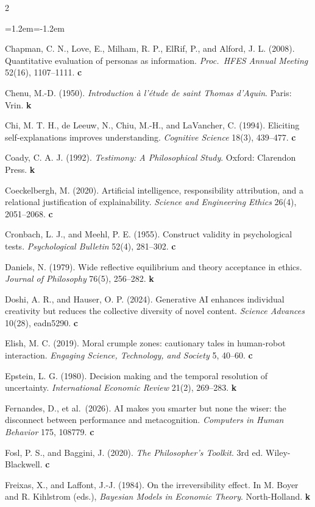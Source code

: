 \documentclass[11pt,a4paper]{article}
\newcounter{art}
\begin{document}
\begin{multicols}{2}
\begin{list}{}{\leftmargin=1.2em\itemindent=-1.2em\itemsep=1pt}
\item Chapman, C. N., Love, E., Milham, R. P., ElRif, P., and Alford, J. L. (2008). Quantitative evaluation of personas as information. \textit{Proc.\ HFES Annual Meeting} 52(16), 1107--1111. \textbf{c}
\item Chenu, M.-D. (1950). \textit{Introduction à l'étude de saint Thomas d'Aquin}. Paris: Vrin. \textbf{k}
\item Chi, M. T. H., de Leeuw, N., Chiu, M.-H., and LaVancher, C. (1994). Eliciting self-explanations improves understanding. \textit{Cognitive Science} 18(3), 439--477. \textbf{c}
\item Coady, C. A. J. (1992). \textit{Testimony: A Philosophical Study}. Oxford: Clarendon Press. \textbf{k}
\item Coeckelbergh, M. (2020). Artificial intelligence, responsibility attribution, and a relational justification of explainability. \textit{Science and Engineering Ethics} 26(4), 2051--2068. \textbf{c}
\item Cronbach, L. J., and Meehl, P. E. (1955). Construct validity in psychological tests. \textit{Psychological Bulletin} 52(4), 281--302. \textbf{c}
\item Daniels, N. (1979). Wide reflective equilibrium and theory acceptance in ethics. \textit{Journal of Philosophy} 76(5), 256--282. \textbf{k}
\item Doshi, A. R., and Hauser, O. P. (2024). Generative AI enhances individual creativity but reduces the collective diversity of novel content. \textit{Science Advances} 10(28), eadn5290. \textbf{c}
\item Elish, M. C. (2019). Moral crumple zones: cautionary tales in human-robot interaction. \textit{Engaging Science, Technology, and Society} 5, 40--60. \textbf{c}
\item Epstein, L. G. (1980). Decision making and the temporal resolution of uncertainty. \textit{International Economic Review} 21(2), 269--283. \textbf{k}
\item Fernandes, D., et al.\ (2026). AI makes you smarter but none the wiser: the disconnect between performance and metacognition. \textit{Computers in Human Behavior} 175, 108779. \textbf{c}
\item Fosl, P. S., and Baggini, J. (2020). \textit{The Philosopher's Toolkit}. 3rd ed. Wiley-Blackwell. \textbf{c}
\item Freixas, X., and Laffont, J.-J. (1984). On the irreversibility effect. In M. Boyer and R. Kihlstrom (eds.), \textit{Bayesian Models in Economic Theory}. North-Holland. \textbf{k}

\end{list}
\end{multicols}
\end{document}
